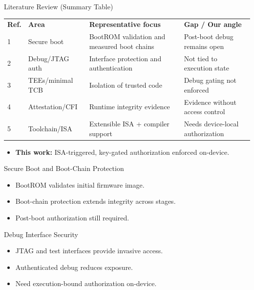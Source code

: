 \documentclass[aspectratio=169]{beamer}
\begin{document}
\begin{frame}{Literature Review (Summary Table)}
  \footnotesize
  \renewcommand{\arraystretch}{1.2}
  \begin{tabular}{@{}p{0.7cm}p{3.4cm}p{4.4cm}p{3.2cm}@{}}
    \rowcolor{gray!20}
    \textbf{Ref.} & \textbf{Area} & \textbf{Representative focus} & \textbf{Gap / Our angle} \\
    1 & Secure boot & BootROM validation and measured boot chains & Post-boot debug remains open \\
    2 & Debug/JTAG auth & Interface protection and authentication & Not tied to execution state \\
    3 & TEEs/minimal TCB & Isolation of trusted code & Debug gating not enforced \\
    4 & Attestation/CFI & Runtime integrity evidence & Evidence without access control \\
    5 & Toolchain/ISA & Extensible ISA + compiler support & Needs device-local authorization \\
  \end{tabular}
  \vspace{0.6ex}
  \begin{itemize}
    \item \textbf{This work:} ISA-triggered, key-gated authorization enforced on-device.
  \end{itemize}
\end{frame}

\begin{frame}{Secure Boot and Boot-Chain Protection}
  \begin{itemize}
    \item BootROM validates initial firmware image.
    \item Boot-chain protection extends integrity across stages.
    \item Post-boot authorization still required.
  \end{itemize}
\end{frame}

\begin{frame}{Debug Interface Security}
  \begin{itemize}
    \item JTAG and test interfaces provide invasive access.
    \item Authenticated debug reduces exposure.
    \item Need execution-bound authorization on-device.
  \end{itemize}
\end{frame}
\end{document}
